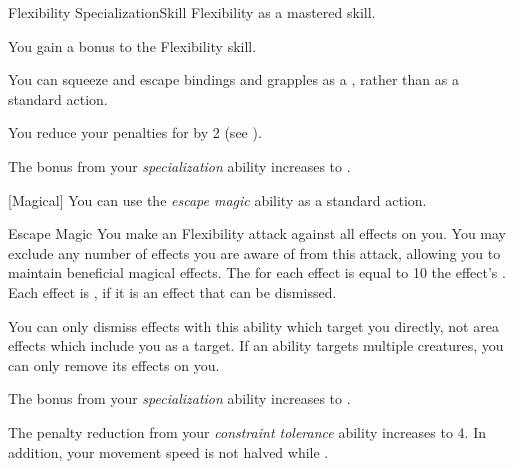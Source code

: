     \begin{feat}{Flexibility Specialization}{Skill}
        \featpre Flexibility as a mastered skill.

         You gain a  bonus to the Flexibility skill.

         You can squeeze and escape bindings and grapples as a , rather than as a standard action.

         You reduce your penalties for \squeezing by 2 (see ).

         The bonus from your \textit{specialization} ability increases to .

        [Magical] You can use the \textit{escape magic} ability as a standard action.
        \begin{freeability}{Escape Magic}
            You make an Flexibility attack against all  effects on you.
            You may exclude any number of effects you are aware of from this attack, allowing you to maintain beneficial magical effects.
            The  for each effect is equal to 10 \add the effect's .
            \hit Each effect is , if it is an effect that can be dismissed.
        \end{freeability}

        You can only dismiss effects with this ability which target you directly, not area effects which include you as a target.
        If an ability targets multiple creatures, you can only remove its effects on you.

         The bonus from your \textit{specialization} ability increases to .

         The penalty reduction from your \textit{constraint tolerance} ability increases to 4.
        In addition, your movement speed is not halved while \squeezing.
    \end{feat}

